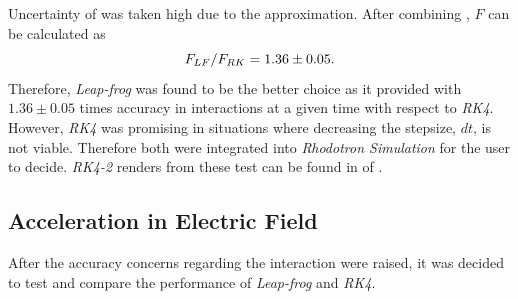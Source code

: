 \documentclass[a4paper,oneside,12pt]{report}
\numberwithin{equation}{chapter}
\begin{document}
\clearpage
Uncertainty of  was taken high due to the approximation. 
After combining , $F$ can be calculated as
\vspace{-10pt}\begin{equation}
    F_{LF}/F_{RK} = 1.36 \pm 0.05.
\vspace{-10pt}\end{equation}
Therefore, \textit{Leap-frog} was found to be the better choice as it provided with $1.36 \pm 0.05$ times accuracy in \eB interactions at a given time with respect to \textit{RK4}. However,
\textit{RK4} was promising in situations where decreasing the stepsize, $dt$, is not viable. Therefore both were integrated into \textit{Rhodotron Simulation} for the user to decide.
\textit{RK4-2} renders from these test can be found in  of .

\subsection{Acceleration in Electric Field}
After the accuracy concerns regarding the \eB interaction were raised, it was decided to test \eE and compare the performance of \textit{Leap-frog} and \textit{RK4}.
\end{document}
